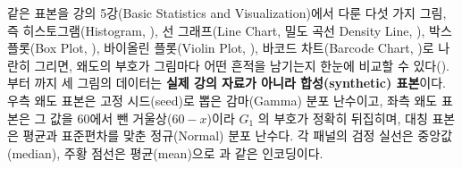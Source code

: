 같은 표본을 강의 5강(Basic Statistics and Visualization)에서 다룬 다섯 가지 그림,
즉 히스토그램(Histogram, ), 선 그래프(Line Chart, 밀도 곡선
Density Line, ), 박스플롯(Box Plot, ),
바이올린 플롯(Violin Plot, ), 바코드 차트(Barcode Chart,
)로 나란히 그리면, 왜도의 부호가 그림마다 어떤 흔적을 남기는지
한눈에 비교할 수 있다(). 부터
까지 세 그림의 데이터는
\textbf{실제 강의 자료가 아니라 합성(synthetic) 표본}이다. 우측 왜도
표본은 고정 시드(seed)로 뽑은 감마(Gamma) 분포 난수이고, 좌측 왜도 표본은 그 값을
$60$에서 뺀 거울상($60-x$)이라 $G_1$ 의 부호가 정확히 뒤집히며, 대칭 표본은 평균과
표준편차를 맞춘 정규(Normal) 분포 난수다. 각 패널의 검정 실선은 중앙값(median),
주황 점선은 평균(mean)으로 과 같은 인코딩이다.

